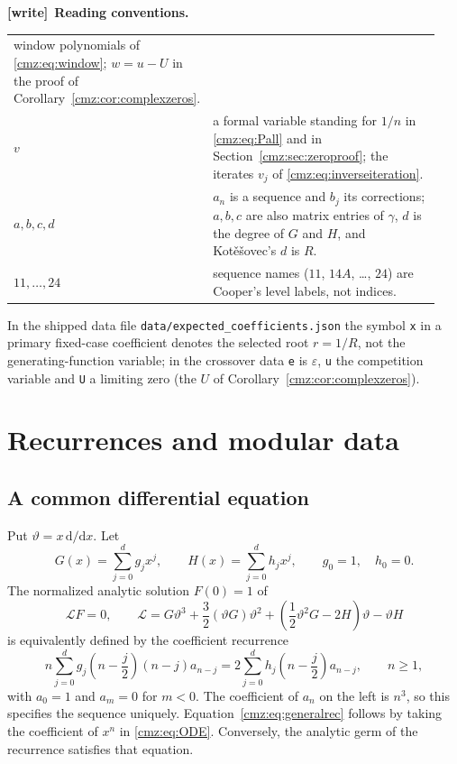 \documentclass[11pt,letterpaper]{article}
\numberwithin{equation}{section}
\theoremstyle{definition}\newtheorem{definition}[theorem]{Definition}
\theoremstyle{remark}\newtheorem{remark}[theorem]{Remark}
\newcommand{\eps}{\varepsilon}
\newcommand{\dd}{\mathrm d}
\newcommand{\tht}{\vartheta}
\newenvironment{writenote}[1][]{\par\smallskip\begingroup\small
 \noindent\textbf{[write]}\if\relax\detokenize{#1}\relax\else~\textbf{#1.}\fi\ }%
 {\par\endgroup\smallskip}
\begin{document}
\begin{writenote}[Reading conventions]
\begin{tabular}{@{}>{\raggedright\arraybackslash}p{0.13\linewidth}
 >{\raggedright\arraybackslash}p{0.81\linewidth}@{}}
 window polynomials of \eqref{cmz:eq:window}; $w=u-U$ in the proof of
 Corollary~\ref{cmz:cor:complexzeros}. \\
$v$ & a formal variable standing for $1/n$ in \eqref{cmz:eq:Pall} and in
 Section~\ref{cmz:sec:zeroproof}; the iterates $v_j$ of
 \eqref{cmz:eq:inverseiteration}. \\
$a,b,c,d$ & $a_n$ is a sequence and $b_j$ its corrections; $a,b,c$ are
 also matrix entries of $\gamma$, $d$ is the degree of $G$ and $H$, and
 Kot\v{e}\v{s}ovec's $d$ is $R$. \\
$11,\dots,24$ & sequence names ($11$, $14A$, \dots, $24$) are Cooper's
 level labels, not indices. \\
\bottomrule
\end{tabular}

\smallskip
In the shipped data file \nolinkurl{data/expected_coefficients.json} the
symbol \texttt{x} in a primary fixed-case coefficient denotes the selected
root $r=1/R$, not the generating-function variable; in the crossover data
\texttt{e} is $\eps$, \texttt{u} the competition variable and \texttt{U} a
limiting zero (the $U$ of Corollary~\ref{cmz:cor:complexzeros}).
\end{writenote}

\section{Recurrences and modular data}
\label{cmz:sec:data}
\subsection{A common differential equation}
Put $\tht=x\,\dd/\dd x$. Let
\[
G(x)=\sum_{j=0}^d g_jx^j,\qquad H(x)=\sum_{j=0}^d h_jx^j,
\qquad g_0=1,\quad h_0=0.
\]
The normalized analytic solution $F(0)=1$ of
\begin{equation}
\mathcal LF=0,\qquad
\mathcal L=G\tht^3+\frac32(\tht G)\tht^2+
       \left(\frac12\tht^2G-2H\right)\tht-\tht H
\label{cmz:eq:ODE}
\end{equation}
is equivalently defined by the coefficient recurrence
\begin{equation}
n\sum_{j=0}^d g_j\left(n-\frac j2\right)(n-j)a_{n-j}
 =2\sum_{j=0}^d h_j\left(n-\frac j2\right)a_{n-j},
\qquad n\geq1,
\label{cmz:eq:generalrec}
\end{equation}
with $a_0=1$ and $a_m=0$ for $m<0$. The coefficient of $a_n$ on the left is $n^3$, so this specifies the sequence uniquely. Equation~\eqref{cmz:eq:generalrec} follows by taking the coefficient of $x^n$ in \eqref{cmz:eq:ODE}. Conversely, the analytic germ of the recurrence satisfies that equation.
\end{document}
